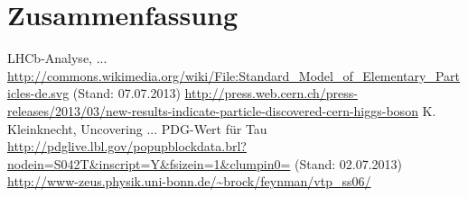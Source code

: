 \documentclass[a4paper]{scrbook}
\begin{document}


\chapter{Zusammenfassung}

\begin{thebibliography}{---}
 LHCb-Analyse, ...
 \url{http://commons.wikimedia.org/wiki/File:Standard_Model_of_Elementary_Particles-de.svg} (Stand: 07.07.2013)
 \url{http://press.web.cern.ch/press-releases/2013/03/new-results-indicate-particle-discovered-cern-higgs-boson}
  K. Kleinknecht, Uncovering ...
 PDG-Wert für Tau \\ \url{http://pdglive.lbl.gov/popupblockdata.brl?nodein=S042T&inscript=Y&fsizein=1&clumpin0=} (Stand: 02.07.2013)
 \url{http://www-zeus.physik.uni-bonn.de/~brock/feynman/vtp_ss06/}
\end{thebibliography}

\printglossaries 

\end{document}
